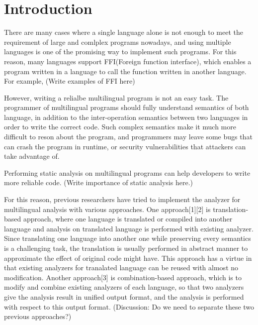 \section{Introduction}

There are many cases where a single language alone is not enough to meet the
requirement of large and comlplex programs nowadays, and using multiple
languages is one of the promising way to implement such programs. For this
reason, many languages support FFI(Foreign function interface), which enables a
program written in a language to call the function written in another language.
For example, (Write examples of FFI here)

However, writing a relialbe multilingual program is not an easy task. The
programmer of multilingual programs should fully understand semantics of both
language, in addition to the inter-operation semantics between two languages in
order to write the correct code.  Such complex semantics make it much more
difficult to reson about the program, and programmers may leave some bugs that
can crash the program in runtime, or security vulnerabilities that attackers
can take advantage of.

Performing static analysis on multilingual programs can help developers to
write more reliable code. (Write importance of static analysis here.)

For this reason, previous researchers have tried to implement the analyzer for
multilingual analysis with various approaches.  One approach[1][2] is
translation-based approach, where one language is translated or compiled into
another language and analysis on translated language is performed with existing
analyzer. Since translating one language into another one while preserving every
semantics is a challenging task, the translation is usually performed in
abstract manner to approximate the effect of original code might have.
This approach has a virtue in that existing analyzers for tranalated
language can be reused with almost no modification.  Another approach[3] is
combination-based approach, which is to modify and combine existing analyzers
of each language, so that two analyzers give the analysis result in unified
output format, and the analysis is performed with respect to this output
format.
(Discussion: Do we need to separate these two previous approaches?)

